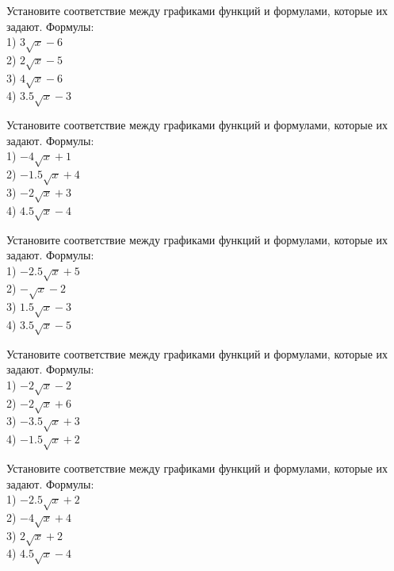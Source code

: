 \documentclass[4apaper]{article}
\begin{document}
\begin{taskBN}{66}
Установите соответствие между графиками функций и формулами, которые их задают. Формулы: \\1) $3\sqrt{x}-6$\\2) $2\sqrt{x}-5$\\3) $4\sqrt{x}-6$\\4) $3.5\sqrt{x}-3$
\end{taskBN}

\begin{taskBN}{67}
Установите соответствие между графиками функций и формулами, которые их задают. Формулы: \\1) $-4\sqrt{x}+1$\\2) $-1.5\sqrt{x}+4$\\3) $-2\sqrt{x}+3$\\4) $4.5\sqrt{x}-4$
\end{taskBN}

\begin{taskBN}{68}
Установите соответствие между графиками функций и формулами, которые их задают. Формулы: \\1) $-2.5\sqrt{x}+5$\\2) $-\sqrt{x}-2$\\3) $1.5\sqrt{x}-3$\\4) $3.5\sqrt{x}-5$
\end{taskBN}

\begin{taskBN}{69}
Установите соответствие между графиками функций и формулами, которые их задают. Формулы: \\1) $-2\sqrt{x}-2$\\2) $-2\sqrt{x}+6$\\3) $-3.5\sqrt{x}+3$\\4) $-1.5\sqrt{x}+2$
\end{taskBN}

\begin{taskBN}{70}
Установите соответствие между графиками функций и формулами, которые их задают. Формулы: \\1) $-2.5\sqrt{x}+2$\\2) $-4\sqrt{x}+4$\\3) $2\sqrt{x}+2$\\4) $4.5\sqrt{x}-4$
\end{taskBN}
\end{document}
